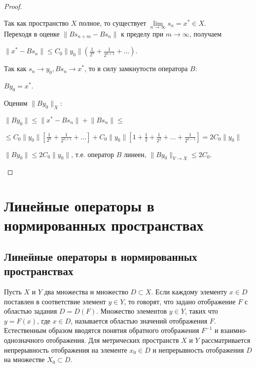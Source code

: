 \documentclass[12pt,a4paper,titlepage]{book}
\theoremstyle{definition}
\theoremstyle{plain}
\theoremstyle{remark}
\theoremstyle{remark}
\theoremstyle{remark}
\theoremstyle{plain}
\begin{document}
\begin{proof}
\begin{enumerate}
Так как пространство $X$ полное, то существует $\lim \limits_{n \rightarrow \infty} s_n=x^* \in X$. \\
Переходя в оценке $ \lVert B s_{n+m}-B s_n \rVert$ к пределу при $m \rightarrow \infty$, получаем
\begin{center}
$ \lVert x^*-B s_n \rVert \leq C_0 \lVert y_0\rVert (\frac{1}{2^n} + \frac{1}{2^{n+1}}+...)$.
\end{center}

Так как $s_n \rightarrow y_0, B s_n \rightarrow x^*$, то в силу замкнутости оператора $B$: 
\begin{center}
$B y_0=x^* $.
\end{center}

Оценим $\lVert B y_0 \rVert _X$:
\begin{center}
$\lVert B y_0 \rVert \leq \lVert x^* - B s_n \rVert + \lVert B s_n \rVert \leq$ 
\end{center}
\begin{center}
$\leq C_0 \lVert y_0\rVert [\frac{1}{2^n} + \frac{1}{2^{n+1}}+...] + C_0 \lVert y_0\rVert [1+\frac{1}{2} +\frac{1}{2^2}+ ...+\frac{1}{2^{n-1}}]= 2 C_0 \lVert y_0\rVert$
\end{center}
$\lVert B y_0 \rVert \leq 2 C_0 \lVert y_0\rVert$, т.е. оператор $B$ линеен, $ \lVert B y_0 \rVert _{Y \rightarrow X} \leq 2 C_0$.
\end{enumerate}
\end{proof}

\chapter{Линейные операторы в нормированных пространствах}

\section{Линейные операторы в нормированных пространствах}
Пусть $X$ и $Y$ два множества и множество $D \subset X$. Если каждому элементу $x \in D$ поставлен в соответствие элемент $y \in Y$, то говорят, что задано отображение $F$ с областью задания $D=D(F)$. Множество элементов $y \in Y$, таких что $y=F(x)$, где $x \in D$, называется областью значений отображения $F$. Естественным образом вводятся понятия обратного отображения ${F}^{-1}$ и взаимно-однозначного отображения. Для метрических пространств $X$ и $Y$ рассматривается непрерывность отображения на элементе $x_0 \in D$ и непрерывность отображения $D$ на множестве $X_0 \subset D$.
\end{document}
